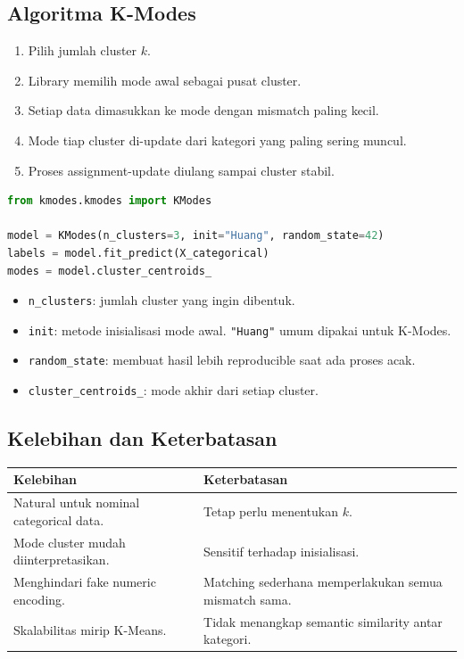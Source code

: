 \documentclass{article}
\newcommand{\code}[1]{\texttt{#1}}
\begin{document}
\subsection{Algoritma K-Modes}
\begin{enumerate}[leftmargin=*]
    \item Pilih jumlah cluster $k$.
    \item Library memilih mode awal sebagai pusat cluster.
    \item Setiap data dimasukkan ke mode dengan mismatch paling kecil.
    \item Mode tiap cluster di-update dari kategori yang paling sering muncul.
    \item Proses assignment-update diulang sampai cluster stabil.
\end{enumerate}
\begin{lstlisting}[language=Python]
from kmodes.kmodes import KModes

model = KModes(n_clusters=3, init="Huang", random_state=42)
labels = model.fit_predict(X_categorical)
modes = model.cluster_centroids_
\end{lstlisting}
\begin{itemize}[leftmargin=*]
    \item \code{n\_clusters}: jumlah cluster yang ingin dibentuk.
    \item \code{init}: metode inisialisasi mode awal. \code{"Huang"} umum dipakai untuk K-Modes.
    \item \code{random\_state}: membuat hasil lebih reproducible saat ada proses acak.
    \item \code{cluster\_centroids\_}: mode akhir dari setiap cluster.
\end{itemize}

\subsection{Kelebihan dan Keterbatasan}

\begin{table}[H]
\centering
{}
\begin{tabularx}{\textwidth}{XX}
\rowcolor{tableHead}
Kelebihan & Keterbatasan \\
\toprule
Natural untuk nominal categorical data. & Tetap perlu menentukan $k$. \\
Mode cluster mudah diinterpretasikan. & Sensitif terhadap inisialisasi. \\
Menghindari fake numeric encoding. & Matching sederhana memperlakukan semua mismatch sama. \\
Skalabilitas mirip K-Means. & Tidak menangkap semantic similarity antar kategori. \\
\bottomrule
\end{tabularx}
\end{table}
\end{document}
